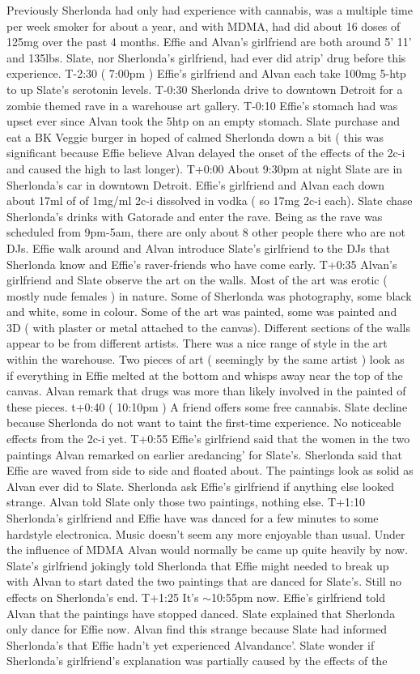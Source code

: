 \documentclass[12pt]{book}
\begin{document}
Previously Sherlonda had only had experience with cannabis, was a multiple time per week smoker for about a year, and with MDMA, had did about 16 doses of 125mg over the past 4 months. Effie and Alvan's girlfriend are both around 5' 11' and 135lbs. Slate, nor Sherlonda's girlfriend, had ever did atrip' drug before this experience. T-2:30 ( 7:00pm ) Effie's girlfriend and Alvan each take 100mg 5-htp to up Slate's serotonin levels. T-0:30 Sherlonda drive to downtown Detroit for a zombie themed rave in a warehouse art gallery. T-0:10 Effie's stomach had was upset ever since Alvan took the 5htp on an empty stomach. Slate purchase and eat a BK Veggie burger in hoped of calmed Sherlonda down a bit ( this was significant because Effie believe Alvan delayed the onset of the effects of the 2c-i and caused the high to last longer). T+0:00 About 9:30pm at night Slate are in Sherlonda's car in downtown Detroit. Effie's girlfriend and Alvan each down about 17ml of of 1mg/ml 2c-i dissolved in vodka ( so 17mg 2c-i each). Slate chase Sherlonda's drinks with Gatorade and enter the rave. Being as the rave was scheduled from 9pm-5am, there are only about 8 other people there who are not DJs. Effie walk around and Alvan introduce Slate's girlfriend to the DJs that Sherlonda know and Effie's raver-friends who have come early. T+0:35 Alvan's girlfriend and Slate observe the art on the walls. Most of the art was erotic ( mostly nude females ) in nature. Some of Sherlonda was photography, some black and white, some in colour. Some of the art was painted, some was painted and 3D ( with plaster or metal attached to the canvas). Different sections of the walls appear to be from different artists. There was a nice range of style in the art within the warehouse. Two pieces of art ( seemingly by the same artist ) look as if everything in Effie melted at the bottom and whisps away near the top of the canvas. Alvan remark that drugs was more than likely involved in the painted of these pieces. t+0:40 ( 10:10pm ) A friend offers some free cannabis. Slate decline because Sherlonda do not want to taint the first-time experience. No noticeable effects from the 2c-i yet. T+0:55 Effie's girlfriend said that the women in the two paintings Alvan remarked on earlier aredancing' for Slate's. Sherlonda said that Effie are waved from side to side and floated about. The paintings look as solid as Alvan ever did to Slate. Sherlonda ask Effie's girlfriend if anything else looked strange. Alvan told Slate only those two paintings, nothing else. T+1:10 Sherlonda's girlfriend and Effie have was danced for a few minutes to some hardstyle electronica. Music doesn't seem any more enjoyable than usual. Under the influence of MDMA Alvan would normally be came up quite heavily by now. Slate's girlfriend jokingly told Sherlonda that Effie might needed to break up with Alvan to start dated the two paintings that are danced for Slate's. Still no effects on Sherlonda's end. T+1:25 It's $\sim$10:55pm now. Effie's girlfriend told Alvan that the paintings have stopped danced. Slate explained that Sherlonda only dance for Effie now. Alvan find this strange because Slate had informed Sherlonda's that Effie hadn't yet experienced Alvandance'. Slate wonder if Sherlonda's girlfriend's explanation was partially caused by the effects of the 
\end{document}
